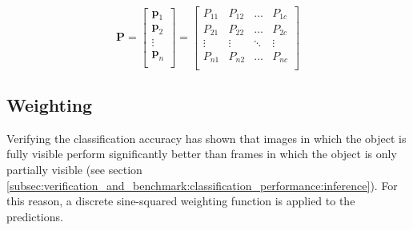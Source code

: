 \begin{equation}
  \boldsymbol{P} =
  \begin{bmatrix}
    \boldsymbol{p}_1 \\
    \boldsymbol{p}_2 \\
    \vdots \\
    \boldsymbol{p}_n \\
  \end{bmatrix} =
  \begin{bmatrix}
    P_{11} & P_{12} & \dots & P_{1c} \\
    P_{21} & P_{22} & \dots & P_{2c} \\
    \vdots & \vdots & \ddots & \vdots \\
    P_{n1} & P_{n2} & \dots & P_{nc} \\
  \end{bmatrix}
  \label{eq:predictions_matrix}
\end{equation}

\subsection{Weighting}
\label{subsec:inference:app:weighting}

Verifying the classification accuracy has shown that images in which the object is fully visible perform significantly better than frames in which the object is only partially visible (see section \ref{subsec:verification_and_benchmark:classification_performance:inference}). %
For this reason, a discrete sine-squared weighting function is applied to the predictions.

